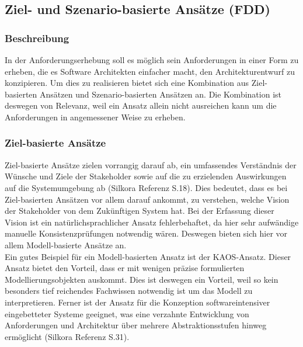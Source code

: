 \subsection{Ziel- und Szenario-basierte Ans\"atze (FDD)}
\subsubsection{Beschreibung}
In der Anforderungserhebung soll es m\"oglich sein Anforderungen in einer Form zu erheben, die es Software Architekten einfacher macht, den Architekturentwurf zu konzipieren. Um dies zu realisieren bietet sich eine Kombination aus Ziel-basierten Ans\"atzen und Szenario-basierten Ans\"atzen an. Die Kombination ist deswegen von Relevanz, weil ein Ansatz allein nicht ausreichen kann um die Anforderungen in angemessener Weise zu erheben.
\subsubsection{Ziel-basierte Ans\"atze}
Ziel-basierte Ans\"atze zielen vorrangig darauf ab, ein umfassendes Verst\"andnis der W\"unsche und Ziele der Stakeholder sowie auf die zu erzielenden Auswirkungen auf die Systemumgebung ab (Silkora Referenz S.18). Dies bedeutet, dass es bei Ziel-basierten Ans\"atzen vor allem darauf ankommt, zu verstehen, welche Vision der Stakeholder von dem Zuk\"unftigen System hat. Bei der Erfassung dieser Vision ist ein nat\"urlichsprachlicher Ansatz fehlerbehaftet, da hier sehr aufw\"andige manuelle Konsistenzpr\"ufungen notwendig w\"aren. Deswegen bieten sich hier vor allem Modell-basierte Ans\"atze an.\\
Ein gutes Beispiel f\"ur ein Modell-basierten Ansatz ist der KAOS-Ansatz. Dieser Ansatz bietet den Vorteil, dass er mit wenigen pr\"azise formulierten Modellierungsobjekten auskommt. Dies ist deswegen ein Vorteil, weil so kein besonders tief reichendes Fachwissen notwendig ist um das Modell zu interpretieren. Ferner ist der Ansatz f\"ur die Konzeption softwareintensiver eingebetteter Systeme geeignet, was eine verzahnte Entwicklung von Anforderungen und Architektur \"uber mehrere Abstraktionsstufen hinweg erm\"oglicht (Silkora Referenz S.31).
